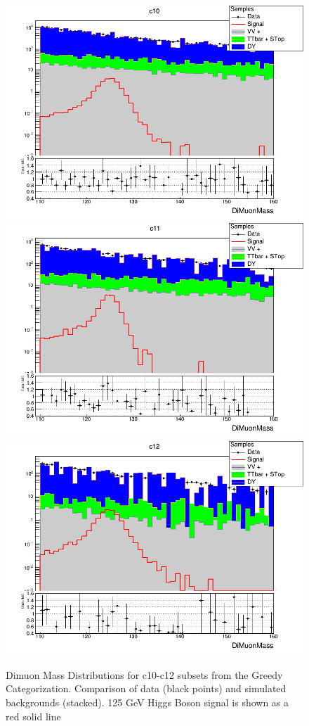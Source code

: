 \begin{figure}[htbp]
  \centering
  \includegraphics[width=0.65\linewidth]{figures/ch_higgs/distributions/bdt_uf/distribution__c10__DiMuonMass__logY.png}\\
  \includegraphics[width=0.65\linewidth]{figures/ch_higgs/distributions/bdt_uf/distribution__c11__DiMuonMass__logY.png}\\
  \includegraphics[width=0.65\linewidth]{figures/ch_higgs/distributions/bdt_uf/distribution__c12__DiMuonMass__logY.png}
  \caption{Dimuon Mass Distributions for c10-c12 subsets from the Greedy Categorization. Comparison of data (black points) and simulated backgrounds (stacked). 125 GeV Higgs Boson signal is shown as a red solid line}
  \label{fig:higgs_categorization_greedyc10c12}
\end{figure}

